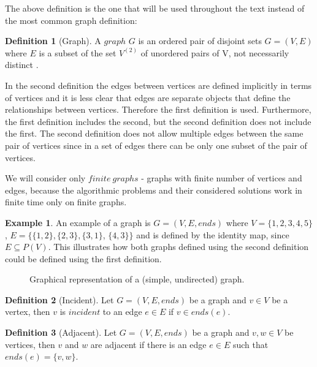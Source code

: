 \documentclass{report}
\theoremstyle{plain}
\theoremstyle{definition}
\newtheorem{definition}{Definition}
\newtheorem{example}{Example}
\theoremstyle{remark}
\numberwithin{definition}{chapter}
\numberwithin{example}{chapter}
\numberwithin{figure}{chapter}
\numberwithin{theorem}{chapter}
\numberwithin{lemma}{chapter}
\begin{document}
The above definition is the one that will be used throughout the text instead of the most common graph definition:

\begin{definition}[Graph]
A $graph$  $G$ is an ordered pair of disjoint sets $G = (V, E)$ where $E$ is a subset of the set $V^{(2)}$ of unordered pairs of V, not necessarily distinct \cite{bollobas1998modern}. 
\end{definition} 

In the second definition the edges between vertices are defined implicitly in terms of vertices and it is less clear that edges are separate objects that define the relationships between vertices. Therefore the first definition is used. Furthermore, the first definition includes the second, but the second definition does not include the first. The second definition does not allow multiple edges between the same pair of vertices since in a set of edges there can be only one subset of the pair of vertices.

We will consider only $finite \ graphs$ - graphs with finite number of vertices and edges, because the algorithmic problems and their considered solutions work in finite time only on finite graphs.

\begin{example}
An example of a graph is $G=(V, E, ends)$ where $V=\{1,2,3,4,5\}$, $E=\{\{1,2\}, \{2,3\}, \{3,1\}$, $\{4,3\}\}$ and is defined by the identity map, since $E \subseteq P(V)$. This illustrates how both graphs defined using the second definition could be defined using the first definition.

\begin{figure}[h]
\center
{}
\caption{Graphical representation of a (simple, undirected) graph.}
\end{figure}
\end{example}

\begin{definition}[Incident]
Let $G = (V, E, ends)$ be a graph and $v\in V$ be a vertex, then $v$ is $incident$ to an edge $e \in E$ if $v \in ends(e)$.
\end{definition}

\begin{definition}[Adjacent]
Let $G = (V, E, ends)$ be a graph and $v,w\in V$ be vertices, then $v$ and $w$ are adjacent if there is an edge $ e \in E$ such that $ends(e) = \{v, w\}$.
\end{definition}
\end{document}
